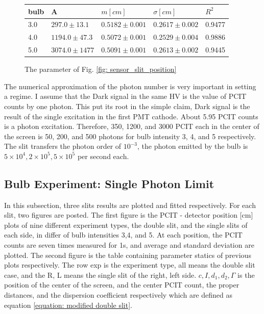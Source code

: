 \documentclass{article}
\begin{document}
\begin{figure}[H]
  \centering
  \begin{tabular}{  m{1cm}|m{2.5cm}|m{2.5cm}|m{2.5cm}| m{2.5cm}} 
    bulb& A& $m[cm]$& $\sigma[cm]$& $R^2$ \\ \hline 
    3.0& $297.0 \pm 13.1$& $0.5182 \pm 0.001$& $0.2617 \pm 0.002$& 0.9477\\ \hline 
    4.0& $1194.0 \pm 47.3$& $0.5072 \pm 0.001$& $0.2529 \pm 0.004$& 0.9886\\ \hline 
    5.0& $3074.0 \pm 1477$& $0.5091 \pm 0.001$& $0.2613 \pm 0.002$& 0.9445\\ \hline 
    
  \end{tabular}
  \caption{The parameter of Fig. \ref{fig: sensor_slit_position}}
  \label{fig: sensor_slit_position_statics}
\end{figure}

The numerical approximation of the photon number is very important in setting a regime.
I assume that the Dark signal in the same HV is the value of PCIT counts by one photon.
This put its root in the simple claim, Dark signal is the result of the single excitation in the first PMT cathode.
About 5.95 PCIT counts is a photon excitation.
Therefore, 350, 1200, and 3000 PCIT each in the center of the screen is 50, 200, and 500 photons for bulb intensity 3, 4, and 5 respectively.
The slit transfers the photon order of $10^{-3}$, the photon emitted by the bulb is $5 \times 10^{4} , 2 \times 10^5 , 5 \times 10^5$ per second each.

\subsection{Bulb Experiment: Single Photon Limit}
In this subsection, three slits results are plotted and fitted respectively.
For each slit, two figures are posted.
The first figure is the PCIT - detector position [cm] plots of nine different experiment types, the double slit, and the single slits of each side, in differ of bulb intensities 3,4, and 5.
At each position, the PCIT counts are seven times measured for 1s, and average and standard deviation are plotted.
The second figure is the table containing parameter statics of previous plots respectively.
The row exp is the experiment type, all means the double slit case, and the R, L means the single slit of the right, left side.
$c, I,d_1,d_2,\Gamma$ is the position of the center of the screen, and the center PCIT count, the proper distances, and the dispersion coefficient respectively which are defined as equation \ref{equation: modified double slit}.
\end{document}
